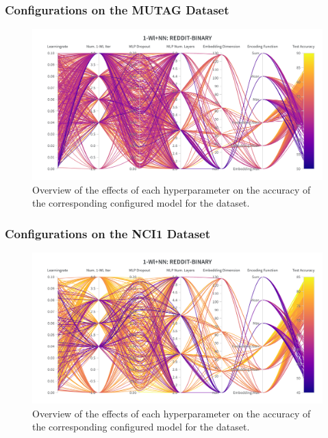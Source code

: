 \subsubsection{\wlnn Configurations on the MUTAG Dataset}
\begin{figure}[H]
    \centering
    \includegraphics[width=\textwidth, trim={0 75 0 150}, clip]{Figures/hyperparameter_wlnn_mutag.png}
    \caption{Overview of the effects of each hyperparameter on the accuracy of the corresponding configured \wlnn model for the \mutag dataset.}
    \label{fig:wandb_wlnn_mutag}
\end{figure}

\subsubsection{\wlnn Configurations on the NCI1 Dataset}
\begin{figure}[H]
    \centering
    \includegraphics[width=\textwidth, trim={0 75 0 150}, clip]{Figures/hyperparameter_wlnn_nci1.png}
    \caption{Overview of the effects of each hyperparameter on the accuracy of the corresponding configured \wlnn model for the \nci dataset.}
    \label{fig:wandb_wlnn_nci}
\end{figure}
\clearpage


